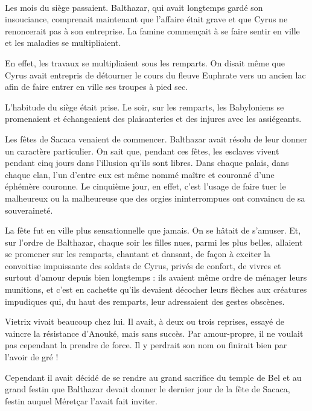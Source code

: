 \documentclass[a4paper, 11pt, oneside, polutonikogreek, french]{article}
\begin{document}
\paragraph{}
Les mois du siège passaient. Balthazar, qui avait longtemps gardé son insouciance, comprenait maintenant que l'affaire était grave et que Cyrus ne renoncerait pas à son entreprise. La famine commençait à se faire sentir en ville et les maladies se multipliaient.

En effet, les travaux se multipliaient sous les remparts. On disait même que Cyrus avait entrepris de détourner le cours du fleuve Euphrate vers un ancien lac afin de faire entrer en ville ses troupes à pied sec.

L'habitude du siège était prise. Le soir, sur les remparts, les Babyloniens se promenaient et échangeaient des plaisanteries et des injures avec les assiégeants.

Les fêtes de Sacaca venaient de commencer. Balthazar avait résolu de leur donner un caractère particulier. On sait que, pendant ces fêtes, les esclaves vivent pendant cinq jours dans l'illusion qu'ils sont libres. Dans chaque palais, dans chaque clan, l'un d'entre eux est même nommé maître et couronné d'une éphémère couronne. Le cinquième jour, en effet, c'est l'usage de faire tuer le malheureux ou la malheureuse que des orgies ininterrompues ont convaincu de sa souveraineté.

La fête fut en ville plus sensationnelle que jamais. On se hâtait de s'amuser. Et, sur l'ordre de Balthazar, chaque soir les filles nues, parmi les plus belles, allaient se promener sur les remparts, chantant et dansant, de façon à exciter la convoitise impuissante des soldats de Cyrus, privés de confort, de vivres et surtout d'amour depuis bien longtemps : ils avaient même ordre de ménager leurs munitions, et c'est en cachette qu'ils devaient décocher leurs flèches aux créatures impudiques qui, du haut des remparts, leur adressaient des gestes obscènes.

Vietrix vivait beaucoup chez lui. Il avait, à deux ou trois reprises, essayé de vaincre la résistance d'Anouké, mais sans succès. Par amour-propre, il ne voulait pas cependant la prendre de force. Il y perdrait son nom ou finirait bien par l'avoir de gré !

Cependant il avait décidé de se rendre au grand sacrifice du temple de Bel et au grand festin que Balthazar devait donner le dernier jour de la fête de Sacaca, festin auquel Méretçar l'avait fait inviter.
\end{document}
